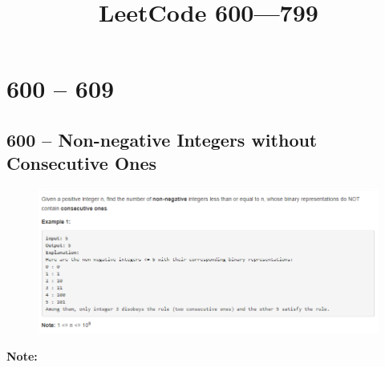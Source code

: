 \documentclass[a4paper,12pt]{article}
\title{LeetCode 600---799}
\begin{document}
	\maketitle
	\section{600 -- 609}
	
	\subsection{600 -- Non-negative Integers without Consecutive Ones}
	\begin{figure}[H]
		\begin{center}
			\includegraphics[width=15cm]{600.png}
		\end{center}
	\end{figure}
	\textbf{\large{Note:}}
	\par
	\vspace{0.5em}
	\noindent
\end{document}
